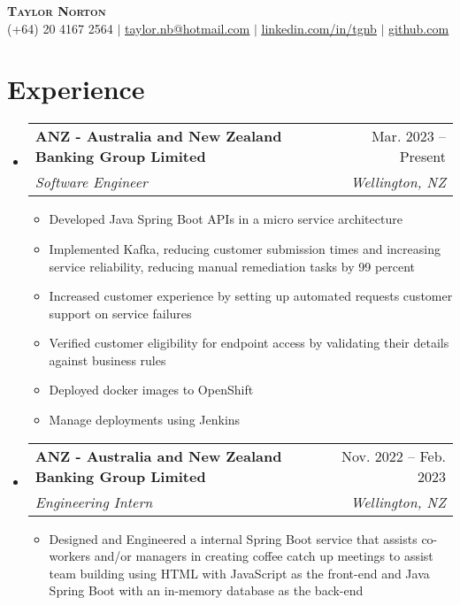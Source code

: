 \documentclass[letterpaper,11pt]{article}
\makeatletter
\newcommand{\resumeItem}[1]{
  \item\small{
    {#1 \vspace{-2pt}}
  }
}
\newcommand{\resumeSubheading}[4]{
  \vspace{-2pt}\item
    \begin{tabular*}{0.97\textwidth}[t]{l@{\extracolsep{\fill}}r}
      \textbf{#1} & #2 \\
      \textit{\small#3} & \textit{\small #4} \\
    \end{tabular*}\vspace{-7pt}
}
\newcommand{\resumeSubSubheading}[2]{
    \item
    \begin{tabular*}{0.97\textwidth}{l@{\extracolsep{\fill}}r}
      \textit{\small#1} & \textit{\small #2} \\
    \end{tabular*}\vspace{-7pt}
}
\newcommand{\resumeSubHeadingListStart}{\begin{itemize}[leftmargin=0.15in, label={}]}
\newcommand{\resumeSubHeadingListEnd}{\end{itemize}}
\newcommand{\resumeItemListStart}{\begin{itemize}\vspace{0pt}}
\newcommand{\resumeItemListEnd}{\end{itemize}\vspace{0pt}}
\makeatother
\begin{document}

\begin{center}
    \textbf{\Huge \scshape Taylor Norton} \\ \vspace{1pt}
    \small (+64) 20 4167 2564 $|$ \href{mailto:taylor.nb@hotmail.com}{\underline{taylor.nb@hotmail.com}} $|$ 
    \href{https://linkedin.com/in/tgnb}{\underline{linkedin.com/in/tgnb}} $|$
    \href{https://github.com/lil-snorts}{\underline{github.com}}
\end{center}



\section{Experience}
  \resumeSubHeadingListStart
    \resumeSubheading
      {ANZ - Australia and New Zealand Banking Group Limited}{Mar. 2023 -- Present}
      {Software Engineer}{Wellington, NZ}
      \resumeItemListStart
        \resumeItem{Developed Java Spring Boot APIs in a micro service architecture}
        \resumeItem{Implemented Kafka, reducing customer submission times and increasing service reliability, reducing manual remediation tasks by 99 percent}
        \resumeItem{Increased customer experience by setting up automated requests customer support on service failures}
        \resumeItem{Verified customer eligibility for endpoint access by validating their details against business rules}
        \resumeItem{Deployed docker images to OpenShift}
        \resumeItem{Manage deployments using Jenkins}
    \resumeItemListEnd
        
    \resumeSubheading
      {ANZ - Australia and New Zealand Banking Group Limited}{Nov. 2022 -- Feb. 2023}
      {Engineering Intern}{Wellington, NZ}
      \resumeItemListStart
        \resumeItem{Designed and Engineered a internal Spring Boot service that assists co-workers and/or managers in creating coffee catch up meetings to assist team building using HTML with JavaScript as the front-end and Java Spring Boot with an in-memory database as the back-end}
      \resumeItemListEnd
    \resumeSubHeadingListEnd      
\end{document}
